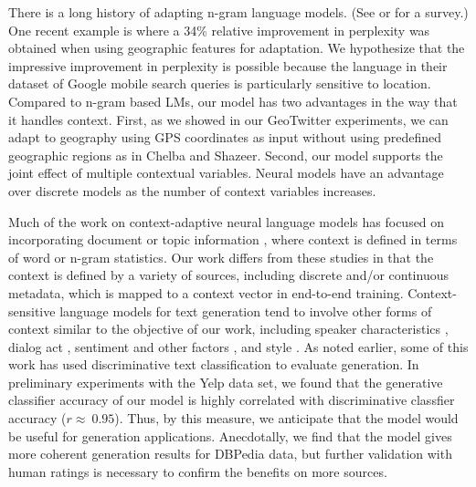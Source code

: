 There is a long history of adapting n-gram language models. (See  or  for a survey.) One recent example is  where a 34\% relative improvement in perplexity was obtained when using geographic features for adaptation. We hypothesize that the impressive improvement in perplexity is possible because the language in their dataset of Google mobile search queries is particularly sensitive to location. Compared to n-gram based LMs, our model has two advantages in the way that it handles context. First, as we showed in our GeoTwitter experiments, we can adapt to geography using GPS coordinates as input without using predefined geographic regions as in Chelba and Shazeer. Second, our model supports the joint effect of multiple contextual variables. Neural models have an advantage over discrete models as the number of context variables increases.

Much of the work on context-adaptive neural language models has focused on incorporating document or topic information \cite{mikolov2012context,Ji2015DocumentCL,ghosh2016contextual,dieng2016topicrnn}, 
where context is defined in terms of word or n-gram statistics. Our work differs from these studies in that the context is defined by a variety of sources, including discrete and/or continuous metadata, which is mapped to a context vector in end-to-end training.
Context-sensitive language models for text generation tend to involve other forms of context similar to the objective of our work, including speaker characteristics \mbox{\cite{LuanRole,li2016persona}}, dialog act \cite{WenCU2015}, sentiment and other factors \mbox{\cite{TangContextAware,Hu2017ControllableTG}}, and style \cite{Ficler2017ControllingLS}.
As noted earlier, some of this work has used discriminative text classification to evaluate generation. In preliminary experiments with the Yelp data set, we found that the generative classifier accuracy of our model is highly correlated with discriminative classfier accuracy (\mbox{$r \approx~0.95$}). Thus, by this measure, we anticipate that the model would be useful for generation applications. Anecdotally, we find that the model gives more coherent generation results for DBPedia data, but further validation with human ratings is necessary to confirm the benefits on more sources.





